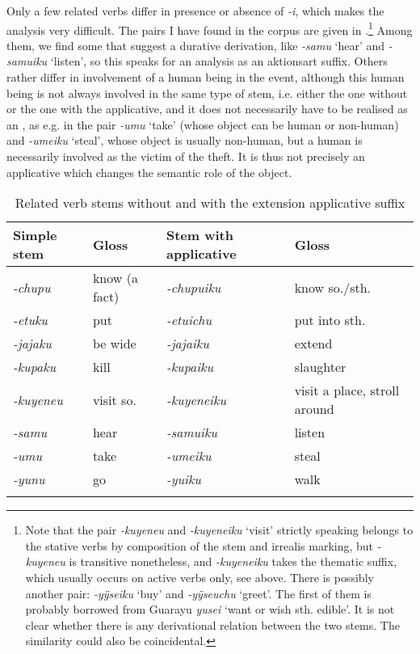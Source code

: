 Only a few related verbs differ in presence or absence of \textit{-i}, which makes the analysis very difficult. The pairs I have found in the corpus are given in .\footnote{Note that the pair \textit{-kuyeneu} and \textit{-kuyeneiku} ‘visit’ strictly speaking belongs to the stative verbs by composition of the stem and irrealis marking, but \textit{-kuyeneu} is transitive nonetheless, and \textit{-kuyeneiku} takes the thematic suffix, which usually occurs on active verbs only, see  above. There is possibly another pair: \textit{-yÿseiku} ‘buy’ and \textit{-yÿseuchu} ‘greet’. The first of them is probably borrowed from Guarayu \textit{yusei} ‘want or wish sth. edible’. It is not clear whether there is any derivational relation between the two stems. The similarity could also be coincidental.} Among them, we find some that suggest a durative derivation, like \textit{-samu} ‘hear’ and \textit{-samuiku} ‘listen’, so this speaks for an analysis as an aktionsart suffix. Others rather differ in involvement of a human being in the event, although this human being is not always involved in the same type of stem, i.e. either the one without or the one with the applicative, and it does not necessarily have to be realised as an , as e.g. in the pair \textit{-umu} ‘take’ (whose object can be human or non-human) and \textit{-umeiku} ‘steal’, whose object is usually non-human, but a human is necessarily involved as the victim of the theft. It is thus not precisely an applicative which changes the semantic role of the object.

\begin{table}
\caption{Related verb stems without and with the extension applicative suffix}

\begin{tabularx}{\textwidth}{lllQ}
\lsptoprule
Simple stem & Gloss & Stem with applicative & Gloss \\
\midrule
\textit{-chupu} & know (a fact) & \textit{-chupuiku} & know so./sth.\\
\textit{-etuku} & put & \textit{-etuichu} & put into sth.\\
\textit{-jajaku} & be wide & \textit{-jajaiku} & extend \\
\textit{-kupaku} & kill & \textit{-kupaiku} & slaughter\\
\textit{-kuyeneu} & visit so. & \textit{-kuyeneiku} & visit a place, stroll around\\
\textit{-samu} & hear & \textit{-samuiku} & listen\\
\textit{-umu} & take & \textit{-umeiku} & steal\\
\textit{-yunu} & go & \textit{-yuiku} & walk\\
\lspbottomrule
\end{tabularx}

\label{table:AKT-i-deriv}
\end{table}


